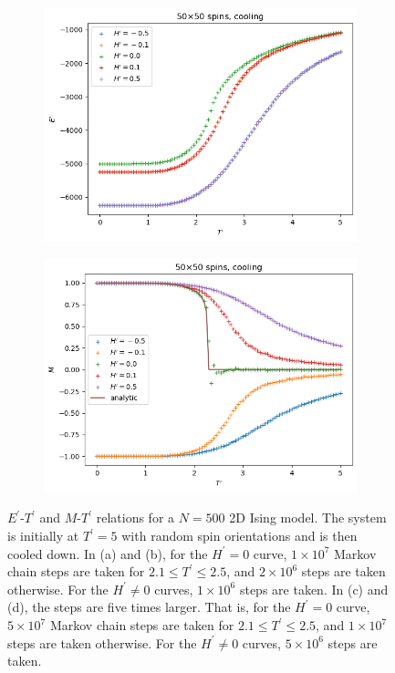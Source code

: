 \documentclass[11pt]{article}
\begin{document}
\begin{figure}[H]
    \begin{subfigure}[H]{0.48\textwidth}
        \centering
        \includegraphics[width=\textwidth]{Cool/cool_energy_N50_steps10000000-50000000_Hsteps5000000.png}
        \caption{}
        \label{coolEl}
    \end{subfigure}
    \hfill
    \begin{subfigure}[H]{0.48\textwidth}
        \centering
        \includegraphics[width=\textwidth]{Cool/cool_magnetization_N50_steps10000000-50000000_Hsteps5000000.png}
        \caption{}
        \label{coolMl}
    \end{subfigure}
    \caption{$E^\prime$-$T^\prime$ and $M$-$T^\prime$ relations for a $N = 500$ 2D Ising model. The system is initially at $T^\prime = 5$ with random spin orientations and is then cooled down. In (a) and (b), for the $H^\prime = 0$ curve, $1 \times 10^7$ Markov chain steps are taken for $2.1 \leq T^\prime \leq 2.5$, and $2 \times 10^6$ steps are taken otherwise. For the $H^\prime \neq 0$ curves, $1 \times 10^6$ steps are taken. In (c) and (d), the steps are five times larger. That is, for the $H^\prime = 0$ curve, $5 \times 10^7$ Markov chain steps are taken for $2.1 \leq T^\prime \leq 2.5$, and $1 \times 10^7$ steps are taken otherwise. For the $H^\prime \neq 0$ curves, $5 \times 10^6$ steps are taken.}
    \label{fig:cool50}
\end{figure}
\end{document}
